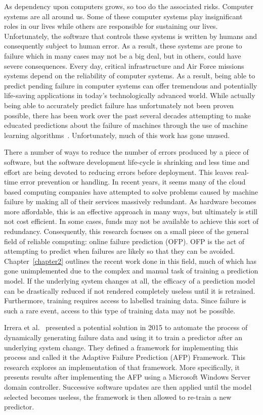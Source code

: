 As dependency upon computers grows, so too do the associated risks.  Computer
systems are all around us.  Some of these computer systems play insignificant
roles in our lives while others are responsible for sustaining our lives.
Unfortunately, the software that controls these systems is written by humans
and consequently subject to human error.  As a result, these systems are prone
to failure which in many cases may not be a big deal, but in others, could have
severe consequences.  Every day, critical infrastructure and Air Force missions
systems depend on the reliability of computer systems.  As a result, being able
to predict pending failure in computer systems can offer tremendous and
potentially life-saving applications in today's technologically advanced world.
While actually being able to accurately predict failure has unfortunately not
been proven possible, there has been work over the past several decades
attempting to make educated predictions about the failure of machines through
the use of machine learning algorithms~\cite{salfnerSurvey}.  Unfortunately,
much of this work has gone unused.  

There a number of ways to reduce the number of errors produced by a piece of
software, but the software development life-cycle is shrinking and less time
and effort are being devoted to reducing errors before deployment.  This leaves
real-time error prevention or handling.  In recent years, it seems many of the
cloud based computing companies have attempted to solve problems caused by
machine failure by making all of their services massively redundant.  As
hardware becomes more affordable, this is an effective approach in many ways,
but ultimately is still not cost efficient.  In some cases, funds may not be
available to achieve this sort of redundancy.  Consequently, this research
focuses on a small piece of the general field of reliable computing: online
failure prediction (OFP).  OFP is the act of attempting to predict when
failures are likely so that they can be avoided.  Chapter~\ref{chapter2}
outlines the recent work done in this field, much of which has gone
unimplemented due to the complex and manual task of training a prediction
model.  If the underlying system changes at all, the efficacy of a prediction
model can be drastically reduced if not rendered completely useless until it is
retrained.  Furthermore, training requires access to labelled training data.
Since failure is such a rare event, access to this type of training data may
not be possible.  

Irrera et al.~\cite{irrera2015} presented a potential solution in 2015 to
automate the process of dynamically generating failure data and using it to
train a predictor after an underlying system change.  They defined a framework
for implementing this process and called it the Adaptive Failure Prediction
(AFP) Framework.  This research explores an implementation of that framework.
More specifically, it presents results after implementing the AFP using a
Microsoft Windows Server domain controller.  Successive software updates are
then applied until the model selected becomes useless, the framework is then
allowed to re-train a new predictor.

